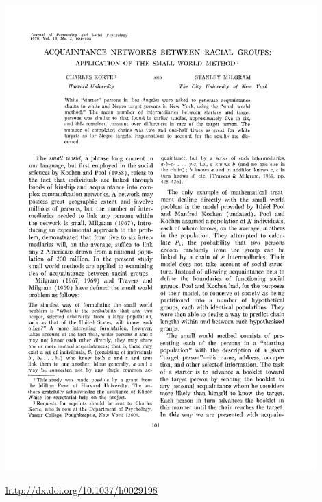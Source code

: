\documentclass[aspectratio=169]{beamer}
\begin{document}
\begin{frame}

\begin{center}
\includegraphics[width=0.9\textwidth]{figures/korte_aquaintance_1970_title}
\end{center}

\vfill
\url{http://dx.doi.org/10.1037/h0029198}

\end{frame}
\end{document}
